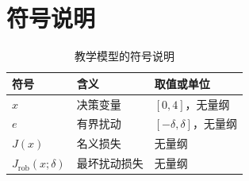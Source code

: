 \section{符号说明}
\begin{table}[htbp]\centering
\caption{教学模型的符号说明}
\begin{tabularx}{\linewidth}{lXl}
\toprule 符号 & 含义 & 取值或单位 \\
\midrule
$x$ & 决策变量 & $[0,4]$，无量纲 \\
$e$ & 有界扰动 & $[-\delta,\delta]$，无量纲 \\
$J(x)$ & 名义损失 & 无量纲 \\
$J_{\mathrm{rob}}(x;\delta)$ & 最坏扰动损失 & 无量纲 \\
\bottomrule
\end{tabularx}\end{table}
